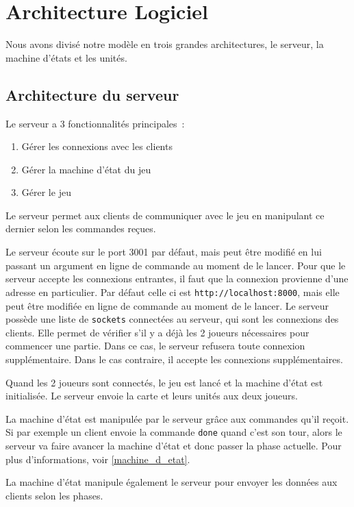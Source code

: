 
\section{Architecture Logiciel}

Nous avons divisé notre modèle en trois grandes architectures, le serveur, la machine d'états et les unités.

\subsection{Architecture du serveur}

Le serveur a 3 fonctionnalités principales :
\begin{enumerate}
    \item Gérer les connexions avec les clients
    \item Gérer la machine d'état du jeu
    \item Gérer le jeu
\end{enumerate}

Le serveur permet aux clients de communiquer avec le jeu en manipulant ce dernier selon les commandes reçues.

Le serveur écoute sur le port 3001 par défaut, mais peut être modifié en lui passant un argument en ligne de commande au moment de le lancer.
Pour que le serveur accepte les connexions entrantes, il faut que la connexion provienne d'une adresse en particulier. Par défaut celle ci est {\tt http://localhost:8000}, mais elle peut être modifiée en ligne de commande au moment de le lancer.
Le serveur possède une liste de {\tt sockets} connectées au serveur, qui sont les connexions des clients. Elle permet de vérifier s'il y a déjà les 2 joueurs nécessaires pour commencer une partie. Dans ce cas, le serveur refusera toute connexion supplémentaire. Dans le cas contraire, il accepte les connexions supplémentaires.

Quand les 2 joueurs sont connectés, le jeu est lancé et la machine d'état est initialisée. Le serveur envoie la carte et leurs unités aux deux joueurs.

La machine d'état est manipulée par le serveur grâce aux commandes qu'il reçoit. Si par exemple un client envoie la commande {\tt done} quand c'est son tour, alors le serveur va faire avancer la machine d'état et donc passer la phase actuelle.
Pour plus d'informations, voir \ref{machine_d_etat}.

La machine d'état manipule également le serveur pour envoyer les données aux clients selon les phases.

